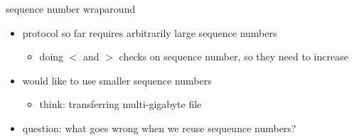 \usetikzlibrary{arrows.meta, calc, fit, matrix, patterns, shapes.misc}

\providecommand{\computer}{%
    \texttt{[image: ../common/Noun\_project\_216.pdf]}
}
\providecommand{\switch}{%
    \texttt{[image: ../common/fig-switch.pdf]}
}
\providecommand{\bigswitch}{%
    \texttt{[image: ../common/fig-switch.pdf]}
}
\providecommand{\router}{%
    \texttt{[image: ../common/fig-router.pdf]}
}


\begin{frame}{sequence number wraparound}
    \begin{itemize}
    \item protocol so far requires arbitrarily large sequence numbers
        \begin{itemize}
        \item doing $<$ and $>$ checks on sequence number, so they need to increase
        \end{itemize}
    \item would like to use smaller sequence numbers
        \begin{itemize}
        \item think: transferring multi-gigabyte file
        \end{itemize}
    \item question: what goes wrong when we reuse sequeunce numbers?
    \end{itemize}
\end{frame}

